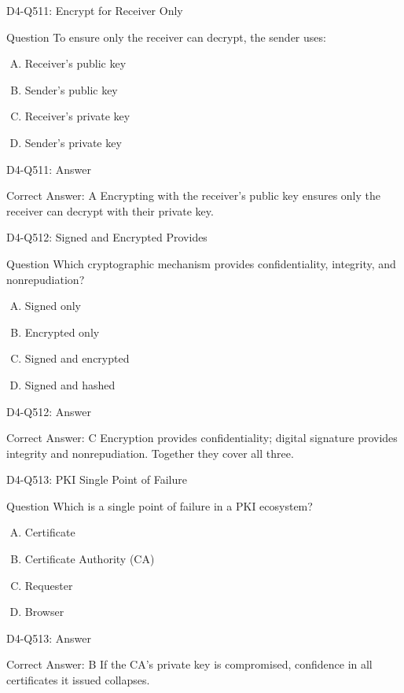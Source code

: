 \documentclass{beamer}
\begin{document}
\begin{frame}{D4-Q511: Encrypt for Receiver Only}
	\begin{block}{Question}
		To ensure only the receiver can decrypt, the sender uses:
	\end{block}
	\begin{enumerate}[(A)]
		\item Receiver's public key
		\item Sender's public key
		\item Receiver's private key
		\item Sender's private key
	\end{enumerate}
\end{frame}
\begin{frame}{D4-Q511: Answer}
	\begin{block}{Correct Answer: A}
		Encrypting with the receiver's public key ensures only the receiver can decrypt with their private key.
	\end{block}
\end{frame}

\begin{frame}{D4-Q512: Signed and Encrypted Provides}
	\begin{block}{Question}
		Which cryptographic mechanism provides confidentiality, integrity, and nonrepudiation?
	\end{block}
	\begin{enumerate}[(A)]
		\item Signed only
		\item Encrypted only
		\item Signed and encrypted
		\item Signed and hashed
	\end{enumerate}
\end{frame}
\begin{frame}{D4-Q512: Answer}
	\begin{block}{Correct Answer: C}
		Encryption provides confidentiality; digital signature provides integrity and nonrepudiation. Together they cover all three.
	\end{block}
\end{frame}

\begin{frame}{D4-Q513: PKI Single Point of Failure}
	\begin{block}{Question}
		Which is a single point of failure in a PKI ecosystem?
	\end{block}
	\begin{enumerate}[(A)]
		\item Certificate
		\item Certificate Authority (CA)
		\item Requester
		\item Browser
	\end{enumerate}
\end{frame}
\begin{frame}{D4-Q513: Answer}
	\begin{block}{Correct Answer: B}
		If the CA's private key is compromised, confidence in all certificates it issued collapses.
	\end{block}
\end{frame}
\end{document}
